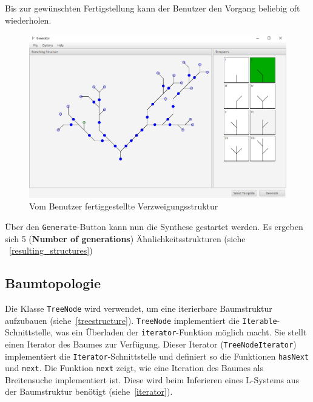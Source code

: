 Bis zur gewünschten Fertigstellung kann der Benutzer den Vorgang beliebig oft wiederholen.
\begin{figure}[H]
    \centering
    \includegraphics[width=13cm]{../images/UI_finished.png}
    \caption{Vom Benutzer fertiggestellte Verzweigungsstruktur}
\end{figure}

Über den \texttt{Generate}-Button kann nun die Synthese gestartet werden.
Es ergeben sich 5 (\textbf{Number of generations}) Ähnlichkeitsstrukturen
(siehe ~\ref{resulting_structures})

\subsection*{Baumtopologie}
Die Klasse \texttt{TreeNode} wird verwendet, um eine iterierbare Baumstruktur aufzubauen (siehe~\ref{treestructure}).
\texttt{TreeNode} implementiert die \texttt{Iterable}-Schnittstelle, was ein Überladen der \texttt{iterator}-Funktion möglich
macht.
Sie stellt einen Iterator des Baumes zur Verfügung.
Dieser Iterator (\texttt{TreeNodeIterator}) implementiert die \texttt{Iterator}-Schnittstelle und definiert so die Funktionen
\texttt{hasNext} und \texttt{next}.
Die Funktion \texttt{next} zeigt, wie eine Iteration des Baumes als Breitensuche implementiert ist.
Diese wird beim Inferieren eines L-Systems aus der Baumstruktur benötigt (siehe~\ref{iterator}).

\newpage

